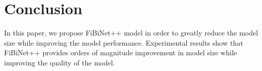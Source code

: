 \documentclass[sigconf]{acmart}
\begin{document}
\section{Conclusion}
In this paper, we propose FiBiNet++ model in order to greatly reduce the model size while improving the model performance. Experimental results show that FiBiNet++ provides orders of magnitude improvement in model size while improving the quality of the model. 






\balance

\end{document}
